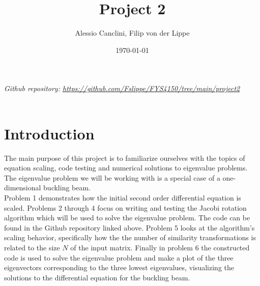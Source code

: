 \documentclass[english,notitlepage]{revtex4-1}  %
\begin{document}
\title{Project 2}
\author{Alessio Canclini, Filip von der Lippe}
\date{\today}
\noaffiliation                            %


\maketitle

\textit{Github repository: \url{https://github.com/Fslippe/FYS4150/tree/main/project2}}
\\
\\
\section*{Introduction}
The main purpose of this project is to familiarize ourselves with the topics
of equation scaling, code testing and numerical solutions to eigenvalue problems. 
The eigenvalue problem we will be working with is a special case of a 
one-dimensional buckling beam. \\
Problem 1 demonstrates how the initial second order differential equation
is scaled. Problems 2 through 4 focus on writing and testing the Jacobi rotation algorithm which
will be used to solve the eigenvalue problem. The code can be found in the Github repository linked above. 
Problem 5 looks at the 
algorithm's scaling behavior, specifically how the the number of similarity transformations 
is related to the size $N$ of the input matrix. Finally in problem 6 the constructed code is used 
to solve the eigenvalue problem and make a plot of the three eigenvectors corresponding to the 
three lowest eigenvalues, visualizing the solutions to the differential equation for the buckling beam. \\
\\
\\
\end{document}
